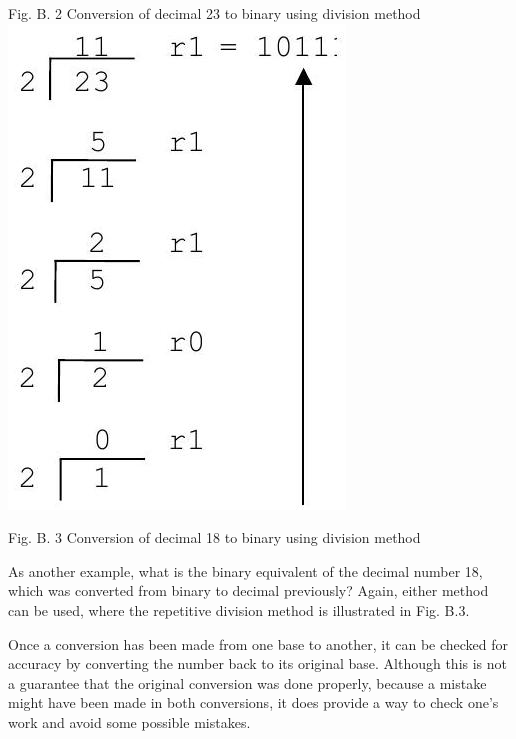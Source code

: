 \documentclass[10pt]{article}
\begin{document}
Fig. B. 2 Conversion of decimal 23 to binary using division method\\
\includegraphics[max width=\textwidth, center]{2025_03_24_ebe50cc223a6fbc49eecg-305}

Fig. B. 3 Conversion of decimal 18 to binary using division method

As another example, what is the binary equivalent of the decimal number 18, which was converted from binary to decimal previously? Again, either method can be used, where the repetitive division method is illustrated in Fig. B.3.

Once a conversion has been made from one base to another, it can be checked for accuracy by converting the number back to its original base. Although this is not a guarantee that the original conversion was done properly, because a mistake might have been made in both conversions, it does provide a way to check one's work and avoid some possible mistakes.
\end{document}
